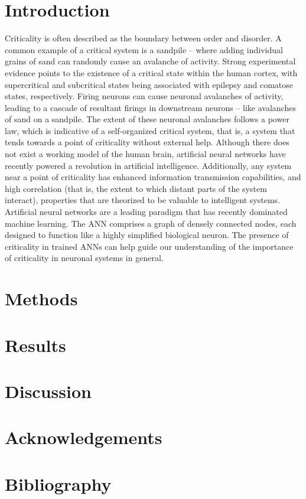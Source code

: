 \documentclass[letterpaper, 12pt]{article}
\begin{document}
\section*{Introduction}
Criticality is often described as the boundary between order and disorder.
A common example of a critical system is a sandpile -- where adding individual grains of sand can randomly cause an avalanche of activity. 
Strong experimental evidence points to the existence of a critical state within the human cortex, with supercritical and subcritical states being associated with epilepsy and comatose states, respectively. 
Firing neurons can cause neuronal avalanches of activity, leading to a cascade of resultant firings in downstream neurons -- like avalanches of sand on a sandpile. 
The extent of these neuronal avalanches follows a power law, which is indicative of a self-organized critical system, that is, a system that tends towards a point of criticality without external help.
Although there does not exist a working model of the human brain, artificial neural networks have recently powered a revolution in artificial intelligence. 
Additionally, any system near a point of criticality has enhanced information transmission capabilities, and high correlation (that is, the extent to which distant parts of the system interact), properties that are theorized to be valuable to intelligent systems. 
Artificial neural networks are a leading paradigm that has recently dominated machine learning. The ANN comprises a graph of densely connected nodes, each designed to function like a highly simplified biological neuron. 
The presence of criticality in trained ANNs can help guide our understanding of the importance of criticality in neuronal systems in general. 



\section*{Methods}
\section*{Results}
\section*{Discussion}
\section*{Acknowledgements}
\section*{Bibliography}
\end{document}

